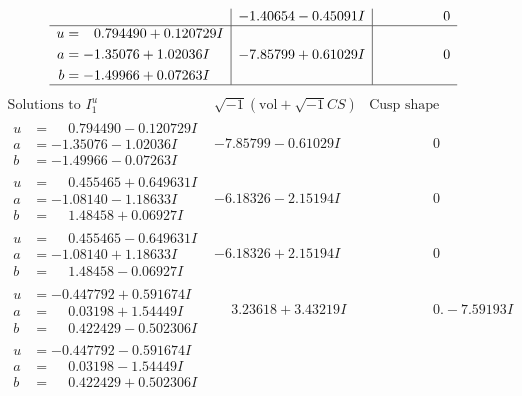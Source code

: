 \documentclass[1p]{elsarticle_modified}
\theoremstyle{definition}
\newcommand{\I}{\sqrt{-1}}
\begin{document}
$$\begin{array}{c|c|c}
 & -1.40654 - 0.45091 I & \phantom{-0.000000 } 0 \\ \hline\begin{aligned}
u &= \phantom{-}0.794490 + 0.120729 I \\
a &= -1.35076 + 1.02036 I \\
b &= -1.49966 + 0.07263 I\end{aligned}
 & -7.85799 + 0.61029 I & \phantom{-0.000000 } 0\\
 \hline 
 \end{array}$$\newpage$$\begin{array}{c|c|c}  
\text{Solutions to }I^u_{1}& \I (\text{vol} + \sqrt{-1}CS) & \text{Cusp shape}\\
 \hline 
\begin{aligned}
u &= \phantom{-}0.794490 - 0.120729 I \\
a &= -1.35076 - 1.02036 I \\
b &= -1.49966 - 0.07263 I\end{aligned}
 & -7.85799 - 0.61029 I & \phantom{-0.000000 } 0 \\ \hline\begin{aligned}
u &= \phantom{-}0.455465 + 0.649631 I \\
a &= -1.08140 - 1.18633 I \\
b &= \phantom{-}1.48458 + 0.06927 I\end{aligned}
 & -6.18326 - 2.15194 I & \phantom{-0.000000 } 0 \\ \hline\begin{aligned}
u &= \phantom{-}0.455465 - 0.649631 I \\
a &= -1.08140 + 1.18633 I \\
b &= \phantom{-}1.48458 - 0.06927 I\end{aligned}
 & -6.18326 + 2.15194 I & \phantom{-0.000000 } 0 \\ \hline\begin{aligned}
u &= -0.447792 + 0.591674 I \\
a &= \phantom{-}0.03198 + 1.54449 I \\
b &= \phantom{-}0.422429 - 0.502306 I\end{aligned}
 & \phantom{-}3.23618 + 3.43219 I & \phantom{-0.000000 } 0. - 7.59193 I \\ \hline\begin{aligned}
u &= -0.447792 - 0.591674 I \\
a &= \phantom{-}0.03198 - 1.54449 I \\
b &= \phantom{-}0.422429 + 0.502306 I\end{aligned}

\end{array}$$
\end{document}
